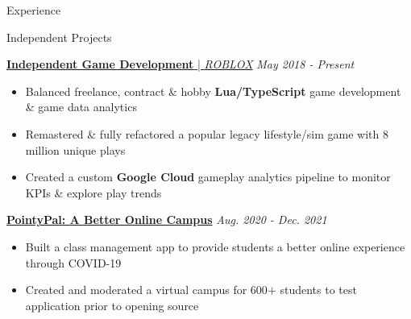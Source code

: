 \documentclass{resume/resume}
\begin{document}
\begin{rSection}{Experience}
  
\end{rSection}

\begin{rSection}{Independent Projects}
  

  \href{https://www.roblox.com/games/849680368/Robloxaville-Next-Generation-BETA}{{\bf Independent Game Development} | {\em ROBLOX}} \hfill {\em May 2018 - Present}
  \vspace{-6pt}
  \begin{itemize}[nosep]
    \item Balanced freelance, contract \& hobby {\bf Lua/TypeScript} game development \& game data analytics
    \item Remastered \& fully refactored a popular legacy lifestyle/sim game with 8 million unique plays
    \item Created a custom {\bf Google Cloud} gameplay analytics pipeline to monitor KPIs \& explore play trends
  \end{itemize}
  

  \href{https://github.com/UtahTriangle/pointypal}{\bf PointyPal: A Better Online Campus} \hfill {\em Aug. 2020 - Dec. 2021}
  \vspace{-6pt}
  \begin{itemize}[nosep]
    \item Built a class management app to provide students a better online experience through COVID-19
    \item Created and moderated a virtual campus for 600$+$ students to test application prior to opening source 
  \end{itemize}


\end{rSection}
\end{document}
